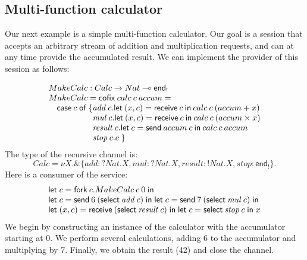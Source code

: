 \documentclass[orivec,envcountsame]{llncs}
\makeatletter
\newcommand{\with}{\mathbin\binampersand}
\newcommand{\gvout}[2]{{!#1.#2}}
\newcommand{\gvin}[2]{{?#1.#2}}
\newcommand{\lto}{\ensuremath{\multimap}}
\newcommand{\uto}{\ensuremath{\rightarrow}}
\newcommand{\outterm}{\mkwd{end}_!}
\newcommand{\interm}{\mkwd{end}_?}
\newcommand{\mkwd}[1]{\mathsf{#1}}
\newcommand{\tkwd}[1]{\textsf{#1}}
\newcommand{\clabel}[1]{\mathit{#1}}
\newcommand{\gvsend}[2]{\mkwd{send}\:#1\:#2}
\newcommand{\gvreceive}[1]{\mkwd{receive}\:#1}
\newcommand{\gvlet}[3]{\mkwd{let}\;#1 = #2\;\mkwd{in}\;#3}
\newcommand{\gvselect}[2]{\mkwd{select}\:#1\:#2}
\newcommand{\gvfork}[2]{\mkwd{fork}\:#1.#2}
\newcommand{\lrkwd}{\mkwd{cofix}}
\newcommand{\ba}{\begin{array}}
\newcommand{\ea}{\end{array}}
\newcommand{\bl}{\ba[t]{@{}l@{}}}
\newcommand{\el}{\ea}
\makeatother
\begin{document}
\subsection{Multi-function calculator}

Our next example is a simple multi-function calculator. Our goal is a session that accepts an
arbitrary stream of addition and multiplication requests, and can at any time provide the
accumulated result.  We can implement the provider of this session as follows:

\small\[
\bl
MakeCalc : Calc \uto Nat \lto \outterm \\
MakeCalc = \lrkwd\:calc\:c\:accum = \\
\quad
  \bl
  \mkwd{case}\:c\;\mkwd{of}\:\{
    \bl
    \clabel{add}\:c.
      \bl
      \mkwd{let}\:(x,c) = \gvreceive{c} \: \mkwd{in}\:
      calc\:c\:(accum + x) \\
      \el \\
    \clabel{mul}\:c.
      \bl
      \mkwd{let}\:(x,c) = \gvreceive{c}\:\mkwd{in}\:
      calc\:c\:(accum \times x) \\
      \el \\
    \clabel{result}\:c.
      \bl
      \mkwd{let}\:c = \gvsend{accum}{c}\:\mkwd{in}\:
      calc\:c\:accum \\
      \el \\
    \clabel{stop}\:c.c \; \}
    \el \\
  \el \\
\el
\]\normalsize
The type of the recursive channel is:
\small\[
 Calc = \nu X. \with \{ \clabel{add}: \gvin{Nat}{X},
                        \clabel{mul}: \gvin{Nat}{X},
                        \clabel{result}: \gvout{Nat}{X},
                        \clabel{stop}: \outterm \}.
\]%
Here is a consumer of the service:
\small\[
\bl
  \gvlet{c}{\gvfork{c}{MakeCalc\:c\:0}}{} \\
  \gvlet{c}{\gvsend{6}{(\gvselect{\clabel{add}}{c})}}{
  \gvlet{c}{\gvsend{7}{(\gvselect{\clabel{mul}}{c})}}{}} \\
  \gvlet{(x,c)}{\gvreceive{(\gvselect{\clabel{result}}{c})}}{
  \gvlet{c}{\gvselect{\clabel{stop}}{c}}{x}}
\el
\]\normalsize
We begin by constructing an instance of the calculator with the accumulator starting at 0. %
We perform several calculations, adding 6 to the accumulator and multiplying by 7.  Finally, we
obtain the result (42) and close the channel.
\end{document}

